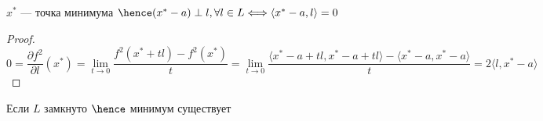 \begin{example}
\begin{enumerate}
\begin{tikzpicture}[x=0.75pt,y=0.75pt,yscale=-1,xscale=1]
\end{tikzpicture}

\begin{statement}
		$x^* $ --- точка минимума $\hence (x^* - a) \perp l, \forall l \in L \Longleftrightarrow \langle x^* - a , l \rangle = 0 $ 
\end{statement}

\begin{proof}
    \[ 
        0 = \frac{\partial f^2}{\partial l}(x^*) = \lim_{t \to 0} \frac{f^2(x^* + tl) - f^2(x^*)}{t} = \lim_{t \to 0} \frac{\langle x^* - a + tl, x^* - a + tl \rangle - \langle x^* - a, x^ * - a\rangle}{t}  = 2 \langle l, x ^ * - a \rangle
    \]
\end{proof}

\end{enumerate}

\end{example}

\begin{exercise}
    Если $L$ замкнуто $\hence$ минимум существует
\end{exercise}

